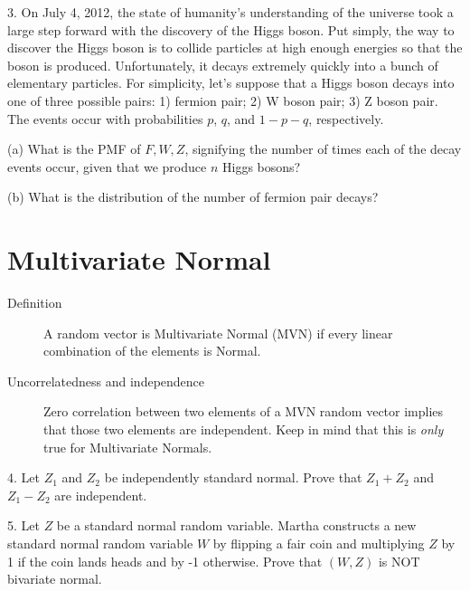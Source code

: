 \documentclass{article}
\begin{document}
3. On July 4, 2012, the state of humanity's understanding of the universe took a large step forward with the discovery of the Higgs boson. Put simply, the way to discover the Higgs boson is to collide particles at high enough energies so that the boson is produced. Unfortunately, it decays extremely quickly into a bunch of elementary particles. For simplicity, let’s suppose that a Higgs boson decays into one of three possible pairs: 1) fermion pair; 2) W boson pair; 3) Z boson pair. The events occur with probabilities $p$, $q$, and $1-p-q$, respectively. 

(a) What is the PMF of $F, W, Z$, signifying the number of times each of the decay events occur, given that we produce $n$ Higgs bosons?


(b) What is the distribution of the number of fermion pair decays?


\section{Multivariate Normal}

\begin{description}

\item[Definition] A random vector is Multivariate Normal (MVN) if every linear combination of the elements is Normal.

\item[Uncorrelatedness and independence] Zero correlation between two elements of a MVN random vector implies that those two elements are independent. Keep in mind that this is \textit{only} true for Multivariate Normals.

\end{description}

4. Let $Z_1$ and $Z_2$ be independently standard normal. Prove that $Z_1+Z_2$ and $Z_1-Z_2$ are independent.


5. Let $Z$ be a standard normal random variable. Martha constructs a new standard normal random variable $W$ by flipping a fair coin and multiplying $Z$ by 1 if the coin lands heads and by -1 otherwise. Prove that $(W,Z)$ is NOT bivariate normal.

\end{document}
